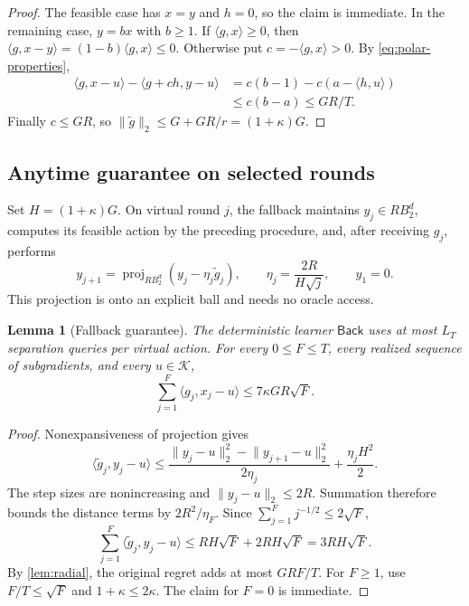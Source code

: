 \documentclass[11pt]{article}
\newcommand{\K}{\mathcal K}
\newcommand{\Back}{\mathsf{Back}}
\newcommand{\ip}[2]{\langle #1,#2\rangle}
\newcommand{\norm}[1]{\lVert #1\rVert}
\DeclareMathOperator{\proj}{proj}
\newtheorem{lemma}[lemma]{Lemma}
\theoremstyle{definition}
\begin{document}
\begin{proof}
The feasible case has $x=y$ and $h=0$, so the claim is immediate.
In the remaining case, $y=bx$ with $b\ge1$. If $\ip{g}{x}\ge0$, then
$\ip{g}{x-y}=(1-b)\ip{g}{x}\le0$. Otherwise put
$c=-\ip{g}{x}>0$. By \eqref{eq:polar-properties},
\begin{align*}
 \ip{g}{x-u}-\ip{g+ch}{y-u}
 &=c(b-1)-c(a-\ip{h}{u})\\
 &\le c(b-a)\le GR/T.
\end{align*}
Finally $c\le GR$, so
$\norm{\widetilde g}_2\le G+GR/r=(1+\kappa)G$.
\end{proof}

\subsection{Anytime guarantee on selected rounds}

Set $H=(1+\kappa)G$. On virtual round $j$, the fallback maintains
$y_j\in RB_2^d$, computes its feasible action by the preceding procedure,
and, after receiving $g_j$, performs
\begin{equation}\label{eq:ogd}
 y_{j+1}=\proj_{RB_2^d}(y_j-\eta_j\widetilde g_j),
 \qquad \eta_j=\frac{2R}{H\sqrt j},\qquad y_1=0.
\end{equation}
This projection is onto an explicit ball and needs no oracle access.

\begin{lemma}[Fallback guarantee]\label{lem:backup}
The deterministic learner $\Back$ uses at most $L_T$ separation queries
per virtual action. For every $0\le F\le T$, every realized sequence of
subgradients, and every $u\in\K$,
\begin{equation}\label{eq:backup}
 \sum_{j=1}^F\ip{g_j}{x_j-u}\le7\kappa GR\sqrt F.
\end{equation}
\end{lemma}

\begin{proof}
Nonexpansiveness of projection gives
\[
 \ip{\widetilde g_j}{y_j-u}
 \le\frac{\norm{y_j-u}_2^2-\norm{y_{j+1}-u}_2^2}{2\eta_j}
       +\frac{\eta_jH^2}{2}.
\]
The step sizes are nonincreasing and $\norm{y_j-u}_2\le2R$.
Summation therefore bounds the distance terms by $2R^2/\eta_F$.
Since $\sum_{j=1}^Fj^{-1/2}\le2\sqrt F$,
\[
 \sum_{j=1}^F\ip{\widetilde g_j}{y_j-u}
 \le RH\sqrt F+2RH\sqrt F=3RH\sqrt F.
\]
By \cref{lem:radial}, the original regret adds at most $GRF/T$.
For $F\ge1$, use $F/T\le\sqrt F$ and $1+\kappa\le2\kappa$.
The claim for $F=0$ is immediate.
\end{proof}
\end{document}
